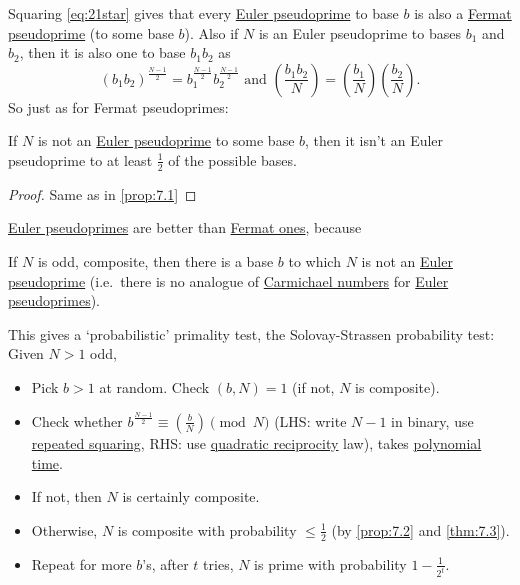 \documentclass{article}
\newcommand{\legendre}[2]{\genfrac{(}{)}{}{}{#1}{#2}}
\begin{document}

Squaring \eqref{eq:21star} gives that every \hyperlink{def:ePseudo}{Euler pseudoprime} to base $b$ is also a \hyperlink{def:pseudo}{Fermat pseudoprime} (to some base $b$).
Also if $N$ is an Euler pseudoprime to bases $b_1$ and $b_2$, then it is also one to base $b_1 b_2$ as
\begin{equation*}
    (b_1 b_2)^{\frac{N-1}{2}} = b_1^{\frac{N-1}{2}} b_2^{\frac{N-1}{2}} \text{ and } \legendre{b_1 b_2}{N} = \legendre{b_1}{N} \legendre{b_2}{N}.
\end{equation*}
So just as for Fermat pseudoprimes:

\begin{nprop}\label{prop:7.2}
    If $N$ is not an \hyperlink{def:ePseudo}{Euler pseudoprime} to some base $b$, then it isn't an Euler pseudoprime to at least $\frac{1}{2}$ of the possible bases.
\end{nprop}

\begin{proof}
    Same as in \cref{prop:7.1}
\end{proof}
\hyperlink{def:ePseudo}{Euler pseudoprimes} are better than \hyperlink{def:pseudo}{Fermat ones}, because
\begin{nthm}\label{thm:7.3}
    If $N$ is odd, composite, then there is a base $b$ to which $N$ is not an \hyperlink{def:pseudo}{Euler pseudoprime} (i.e.\ there is no analogue of \hyperlink{def:carm}{Carmichael numbers} for \hyperlink{def:ePseudo}{Euler pseudoprimes}).
\end{nthm}

This gives a `probabilistic' primality test, the Solovay-Strassen probability test:
Given $N>1$ odd,
\begin{itemize}
    \item Pick $b > 1$ at random. Check $(b, N) = 1$ (if not, $N$ is composite).
    \item Check whether $b^{\frac{N-1}{2}} \equiv \legendre{b}{N} \pmod{N}$
        (LHS: write $N-1$ in binary, use \hyperlink{def:repSquare}{repeated squaring}, RHS: use \hyperlink{thm:qrj}{quadratic reciprocity} law), takes \hyperlink{def:poly}{polynomial time}.
    \item If not, then $N$ is certainly composite.
    \item Otherwise, $N$ is composite with probability $\leq \frac{1}{2}$ (by \cref{prop:7.2} and \cref{thm:7.3}).
    \item Repeat for more $b$'s, after $t$ tries, $N$ is prime with probability $1 - \frac{1}{2^t}$.
\end{itemize}
\end{document}

